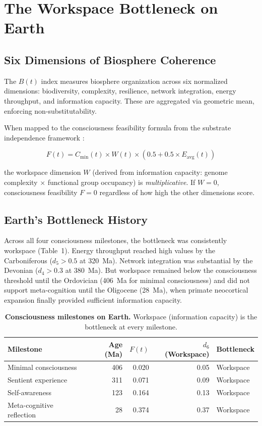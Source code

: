 \documentclass[10pt,letterpaper]{article}
\newcommand{\bt}{$B(t)$}
\begin{document}
\section*{The Workspace Bottleneck on Earth}

\subsection*{Six Dimensions of Biosphere Coherence}

The \bt{} index \cite{stoltz2026bt} measures biosphere organization
across six normalized dimensions: biodiversity, complexity, resilience,
network integration, energy throughput, and information capacity. These
are aggregated via geometric mean, enforcing non-substitutability.

When mapped to the consciousness feasibility formula from the substrate
independence framework \cite{putnam1967, tononi2004}:

\begin{equation}
F(t) = C_{\min}(t) \times W(t) \times (0.5 + 0.5 \times E_{\text{avg}}(t))
\end{equation}

the workspace dimension $W$ (derived from information capacity:
genome complexity $\times$ functional group occupancy) is
\emph{multiplicative}. If $W = 0$, consciousness feasibility $F = 0$
regardless of how high the other dimensions score.

\subsection*{Earth's Bottleneck History}

Across all four consciousness milestones, the bottleneck was consistently
workspace (Table~1). Energy throughput reached high values by the
Carboniferous ($d_5 > 0.5$ at 320~Ma). Network integration was
substantial by the Devonian ($d_4 > 0.3$ at 380~Ma). But workspace
remained below the consciousness threshold until the Ordovician (406~Ma
for minimal consciousness) and did not support meta-cognition until
the Oligocene (28~Ma), when primate neocortical expansion finally
provided sufficient information capacity.

\begin{table}[H]
\caption{{\bf Consciousness milestones on Earth.}
Workspace (information capacity) is the bottleneck at every milestone.}
\begin{tabular}{lrrrl}
\toprule
Milestone & Age (Ma) & $F(t)$ & $d_6$ (Workspace) & Bottleneck \\
\midrule
Minimal consciousness & 406 & 0.020 & 0.05 & Workspace \\
Sentient experience & 311 & 0.071 & 0.09 & Workspace \\
Self-awareness & 123 & 0.164 & 0.13 & Workspace \\
Meta-cognitive reflection & 28 & 0.374 & 0.37 & Workspace \\
\bottomrule
\end{tabular}
\end{table}
\end{document}
